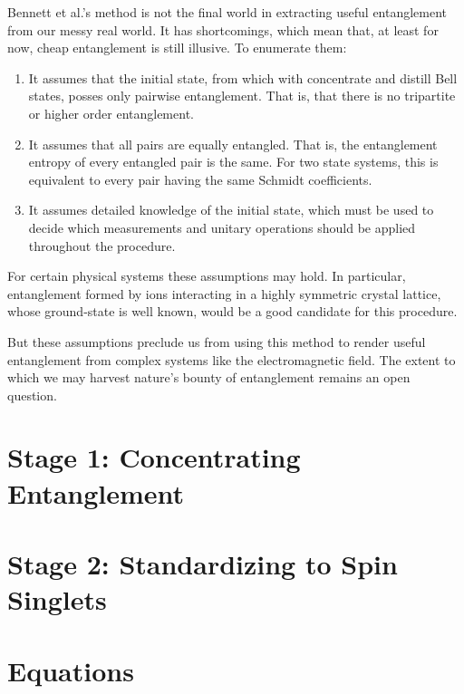 \documentclass[12pt,letterpaper]{article}
\begin{document}
Bennett et al.'s method is not the final world in extracting useful entanglement from our messy real world.
It has shortcomings, which mean that, at least for now, cheap entanglement is still illusive. To enumerate them:
\begin{enumerate}
	\item It assumes that the initial state, from which with concentrate and distill Bell states, posses only pairwise entanglement. That is, that there is no tripartite or higher order entanglement.
	\item It assumes that all pairs are equally entangled. That is, the entanglement entropy of every entangled pair is the same. For two state systems, this is equivalent to every pair having the same Schmidt coefficients.
	\item It assumes detailed knowledge of the initial state, which must be used to decide which measurements and unitary operations should be applied throughout the procedure. 
\end{enumerate} 

For certain physical systems these assumptions may hold. In particular, entanglement formed by ions interacting in a highly symmetric crystal lattice, whose ground-state is well known, would be a good candidate for this procedure.

But these assumptions preclude us from using this method to render useful entanglement from complex systems like the electromagnetic field.
The extent to which we may harvest nature's bounty of entanglement remains an open question.


\section{Stage 1: Concentrating Entanglement}
\section{Stage 2: Standardizing to Spin Singlets}

\section{Equations}

\printbibliography
\end{document}
